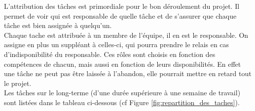L'attribution des tâches est primordiale pour le bon déroulement du projet.
Il permet de voir qui est responsable de quelle tâche et de s'assurer que chaque tâche est bien assignée à quelqu'un. 
\\

Chaque tache est attribuée à un membre de l'équipe, il en est le responsable.
On assigne en plus un suppléant à celles-ci, qui pourra prendre le relais en cas d'indisponibilité du responsable. 
Ces rôles sont choisis en fonction des compétences de chacun, mais aussi en fonction de leurs disponibilités. 
En effet une tâche ne peut pas être laissée à l'abandon, elle pourrait mettre en retard tout le projet.
\\

Les tâches sur le long-terme (d'une durée supérieure à une semaine de travail) 
sont listées dans le tableau ci-dessous (cf Figure \ref*{fig:repartition_des_taches}).
\\


